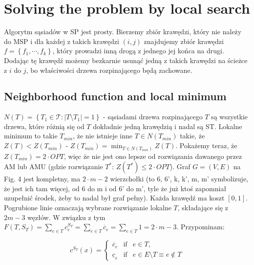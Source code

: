 \section{Solving the problem by local search}

Algorytm sąsiadów w SP jest prosty. Bierzemy zbiór krawędzi, który nie należy do MSP i dla każdej z takich krawędzi $ \left( i, j \right)$ znajdujemy zbiór krawędzi $f = \left\{ f_{1}, \cdots, f_{k} \right\}$, który prowadzi inną drogą z jednego jej końca na drugi. Dodając tę krawędź możemy bezkarnie usunąć jedną z takich krawędzi na ścieżce z $i$ do $j$, bo właściwości drzewa rozpinającego będą zachowane.

\subsection{Neighborhood function and local minimum}

$N \left( T \right) = \left\{ T_{1} \in \mathcal{T} : \left| T \setminus T_{1} \right| = 1 \right\}$ - sąsiadami drzewa rozpinającego $T$ są wszystkie drzewa, które różnią się od $T$ dokładnie jedną krawędzią i nadal są ST. Lokalne minimum to takie $T_{min}$, że nie istnieje inne $T \in N \left( T_{min} \right)$ takie, że $Z \left( T \right) < Z \left( T_{min} \right)$ - $Z \left( T_{min} \right) = \min_{T \in N \left( T_{min} \right)} Z \left( T \right)$. Pokażemy teraz, że $Z \left( T_{min} \right) = 2 \cdot OPT$, więc że nie jest ono lepsze od rozwiązania dawanego przez AM lub AMU (gdzie rozwiązanie $T^{\ast}$: $Z \left( T^{\ast} \right) \leqslant 2 \cdot OPT$). Graf $G = \left( V, E \right)$ na Fig. 4 jest kompletny, ma $2 \cdot m - 2$ wierzchołki (to 6, 6', k, k', m, m' symbolizuje, że jest ich tam więcej, od 6 do m i od 6' do m', tyle że już ktoś zapomniał uzupełnić środek, żeby to nadal był graf pełny). Każda krawędź ma koszt $\left[ 0, 1 \right]$. Pogrubione linie oznaczają wybrane rozwiązanie lokalne $T$, składające się z $2m - 3$ węzłów. W związku z tym $F \left( T, S_{T} \right) = \sum_{e \in T} c_{e}^{S_{T}} = \sum_{e \in T} \overline{c}_{e} = \sum_{e \in T} 1 = 2 \cdot m - 3$. Przypominam:

\begin{equation}
c^{S_{T}} \left( x \right) =
\left\{\begin{matrix}
\overline{c}_{e}	&	\textrm{if}	&	e \in T, \\ 
\underline{c}_{e}	&	\textrm{if}	&	e \in E \setminus T \equiv e \notin T
\end{matrix}\right.
\end{equation}

